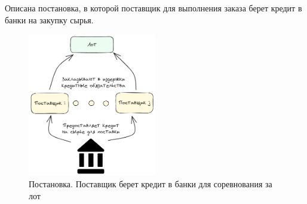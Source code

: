 
Описана постановка, в которой поставщик для выполнения заказа берет кредит в банки на закупку сырья.

\begin{figure}[h]
    \centering
    \includegraphics[width=0.5\textwidth]{assets/settings/bank.excalidraw.png}
    \caption{Постановка. Поставщик берет кредит в банки для соревнования за лот}
\end{figure}


